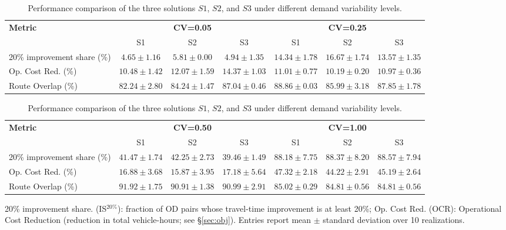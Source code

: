 \documentclass[a4paper,fleqn]{cas-sc}
\begin{document}
\begin{table}[t]
\centering
\scriptsize
\setlength{\tabcolsep}{2.5pt}
\begin{threeparttable}

\begin{tabular}{lcccccc}
\toprule
\textbf{Metric}
  & \multicolumn{3}{c}{\textbf{CV=0.05}}
  & \multicolumn{3}{c}{\textbf{CV=0.25}} \\
\cmidrule(lr){2-4} \cmidrule(lr){5-7}
& S1 & S2 & S3 & S1 & S2 & S3 \\
\midrule
20\% improvement share (\%)
  & $4.65\pm1.16$ & $5.81\pm0.00$ & $4.94\pm1.35$
  & $14.34\pm1.78$ & $16.67\pm1.74$ & $13.57\pm1.35$ \\
Op. Cost Red. (\%)
  & $10.48\pm1.42$ & $12.07\pm1.59$ & $14.37\pm1.03$
  & $11.01\pm0.77$ & $10.19\pm0.20$ & $10.97\pm0.36$ \\
Route Overlap (\%)
  & $82.24\pm2.80$ & $84.24\pm1.47$ & $87.04\pm0.46$
  & $88.86\pm0.03$ & $85.99\pm3.18$ & $87.85\pm1.78$ \\
\bottomrule
\end{tabular}

\vspace{0.5em}

\begin{tabular}{lcccccc}
\toprule
\textbf{Metric}
  & \multicolumn{3}{c}{\textbf{CV=0.50}}
  & \multicolumn{3}{c}{\textbf{CV=1.00}} \\
\cmidrule(lr){2-4} \cmidrule(lr){5-7}
& S1 & S2 & S3 & S1 & S2 & S3 \\
\midrule
20\% improvement share (\%)
  & $41.47\pm1.74$ & $42.25\pm2.73$ & $39.46\pm1.49$
  & $88.18\pm7.75$ & $88.37\pm8.20$ & $88.57\pm7.94$ \\
Op. Cost Red. (\%)
  & $16.88\pm3.68$ & $15.87\pm3.95$ & $17.18\pm5.64$
  & $47.32\pm2.18$ & $44.22\pm2.91$ & $45.19\pm2.64$ \\
Route Overlap (\%)
  & $91.92\pm1.75$ & $90.91\pm1.38$ & $90.99\pm2.91$
  & $85.02\pm0.29$ & $84.81\pm0.56$ & $84.81\pm0.56$ \\
\bottomrule
\end{tabular}

\begin{tablenotes}
\item 20\% improvement share. (IS$^{20\%}$): fraction of OD pairs whose travel-time improvement is at least 20\%;
Op. Cost Red. (OCR): Operational Cost Reduction (reduction in total vehicle-hours; see \S\ref{sec:obj}).
Entries report mean $\pm$ standard deviation over 10 realizations.
\end{tablenotes}

\end{threeparttable}
\caption{Performance comparison of the three solutions $S1$, $S2$, and $S3$ under different demand variability levels.}
\label{tab:randomSEED}
\end{table}
\end{document}
